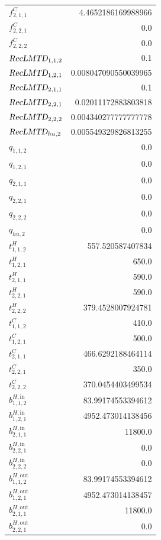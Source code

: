 \documentclass{article}%
\begin{document}
\begin{multicols*}{3}
\begin{supertabular}{lr}
	$f_{2,1,1}^{C}$ & 4.4652186169988966 \\%
	$f_{2,2,1}^{C}$ & 0.0 \\%
	$f_{2,2,2}^{C}$ & 0.0 \\%
	$\textsl{RecLMTD}_{1,1,2}$ & 0.1 \\%
	$\textsl{RecLMTD}_{1,2,1}$ & 0.008047090550039965 \\%
	$\textsl{RecLMTD}_{2,1,1}$ & 0.1 \\%
	$\textsl{RecLMTD}_{2,2,1}$ & 0.02011172883803818 \\%
	$\textsl{RecLMTD}_{2,2,2}$ & 0.004340277777777778 \\%
	$\textsl{RecLMTD}_{hu,2}$ & 0.005549329826813255 \\%
	$q_{1,1,2}$ & 0.0 \\%
	$q_{1,2,1}$ & 0.0 \\%
	$q_{2,1,1}$ & 0.0 \\%
	$q_{2,2,1}$ & 0.0 \\%
	$q_{2,2,2}$ & 0.0 \\%
	$q_{hu,2}$ & 0.0 \\%
	$t_{1,1,2}^{H}$ & 557.520587407834 \\%
	$t_{1,2,1}^{H}$ & 650.0 \\%
	$t_{2,1,1}^{H}$ & 590.0 \\%
	$t_{2,2,1}^{H}$ & 590.0 \\%
	$t_{2,2,2}^{H}$ & 379.4528007924781 \\%
	$t_{1,1,2}^{C}$ & 410.0 \\%
	$t_{1,2,1}^{C}$ & 500.0 \\%
	$t_{2,1,1}^{C}$ & 466.6292188464114 \\%
	$t_{2,2,1}^{C}$ & 350.0 \\%
	$t_{2,2,2}^{C}$ & 370.0454403499534 \\%
	$b_{1,1,2}^{H,\text{in}}$ & 83.99174553394612 \\%
	$b_{1,2,1}^{H,\text{in}}$ & 4952.473014138456 \\%
	$b_{2,1,1}^{H,\text{in}}$ & 11800.0 \\%
	$b_{2,2,1}^{H,\text{in}}$ & 0.0 \\%
	$b_{2,2,2}^{H,\text{in}}$ & 0.0 \\%
	$b_{1,1,2}^{H,\text{out}}$ & 83.99174553394612 \\%
	$b_{1,2,1}^{H,\text{out}}$ & 4952.473014138457 \\%
	$b_{2,1,1}^{H,\text{out}}$ & 11800.0 \\%
	$b_{2,2,1}^{H,\text{out}}$ & 0.0 \\%

\end{supertabular}
\end{multicols*}
\end{document}
